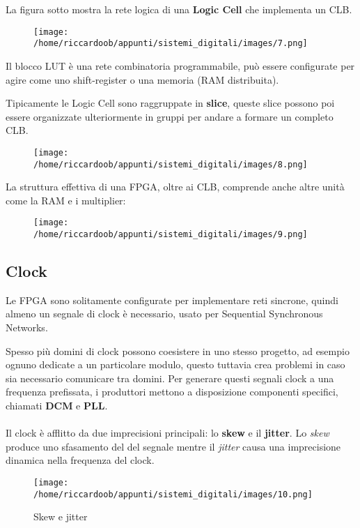 La figura sotto mostra la rete logica di una \textbf{Logic Cell} che implementa un CLB.
\begin{figure}[H]
    \centering
    \texttt{[image: /home/riccardoob/appunti/sistemi\_digitali/images/7.png]}
\end{figure}

Il blocco LUT è una rete combinatoria programmabile, può essere configurate per agire come uno shift-register o una memoria (RAM distribuita).

Tipicamente le Logic Cell sono raggruppate in \textbf{slice}, queste slice possono poi essere organizzate ulteriormente in gruppi per andare a formare un completo CLB.

\begin{figure}[H]
    \centering
    \texttt{[image: /home/riccardoob/appunti/sistemi\_digitali/images/8.png]}
\end{figure}

La struttura effettiva di una FPGA, oltre ai CLB, comprende anche altre unità come la RAM e i multiplier:
\begin{figure}[H]
    \centering
    \texttt{[image: /home/riccardoob/appunti/sistemi\_digitali/images/9.png]}
\end{figure}

\subsection{Clock}
Le FPGA sono solitamente configurate per implementare reti sincrone, quindi almeno un segnale di clock è necessario, usato per Sequential Synchronous Networks.

Spesso più domini di clock possono coesistere in uno stesso progetto, ad esempio ognuno dedicate a un particolare modulo, questo tuttavia crea problemi in caso sia necessario comunicare tra domini.
Per generare questi segnali clock a una frequenza prefissata, i produttori mettono a disposizione componenti specifici, chiamati \textbf{DCM} e \textbf{PLL}.
\\\\
Il clock è afflitto da due imprecisioni principali: lo \textbf{skew} e il \textbf{jitter}. Lo \textit{skew} produce uno sfasamento del del segnale mentre il \textit{jitter} causa una imprecisione dinamica nella frequenza del clock.

\begin{figure}[H]
    \caption{Skew e jitter}
    \centering
    \texttt{[image: /home/riccardoob/appunti/sistemi\_digitali/images/10.png]}
\end{figure}

